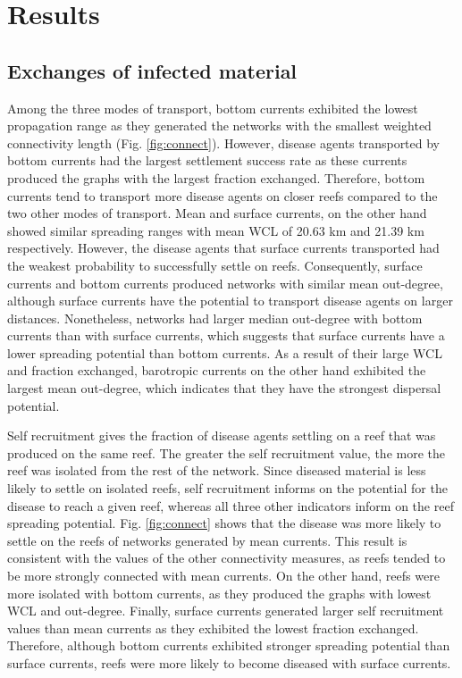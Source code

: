 \documentclass[utf8]{frontiersSCNS}
\begin{document}
\section{Results}

\subsection{Exchanges of infected material}

Among the three modes of transport, bottom currents exhibited the lowest propagation range as they generated the networks with the smallest weighted connectivity length (Fig. \ref{fig:connect}). However, disease agents transported by bottom currents had the largest settlement success rate as these currents produced the graphs with the largest fraction exchanged. Therefore, bottom currents tend to transport more disease agents on closer reefs compared to the two other modes of transport. Mean and surface currents, on the other hand showed similar spreading ranges with mean WCL of 20.63 km and 21.39 km respectively. However, the disease agents that surface currents transported had the weakest probability to successfully settle on reefs. Consequently, surface currents and bottom currents produced networks with similar mean out-degree, although surface currents have the potential to transport disease agents on larger distances. Nonetheless, networks had larger median out-degree with bottom currents than with surface currents, which suggests that surface currents have a lower spreading potential than bottom currents. As a result of their large WCL and fraction exchanged, barotropic currents on the other hand exhibited the largest mean out-degree, which indicates that they have the strongest dispersal potential. 

Self recruitment gives the fraction of disease agents settling on a reef that was produced on the same reef. The greater the self recruitment value, the more the reef was isolated from the rest of the network. Since diseased material is less likely to settle on isolated reefs, self recruitment informs on the potential for the disease to reach a given reef, whereas all three other indicators inform on the reef spreading potential. Fig. \ref{fig:connect} shows that the disease was more likely to settle on the reefs of networks generated by mean currents. This result is consistent with the values of the other connectivity measures, as reefs tended to be more strongly connected with mean currents. On the other hand, reefs were more isolated with bottom currents, as they produced the graphs with lowest WCL and out-degree. Finally, surface currents generated larger self recruitment values than mean currents as they exhibited the lowest fraction exchanged. Therefore, although bottom currents exhibited stronger spreading potential than surface currents, reefs were more likely to become diseased with surface currents.
\end{document}
